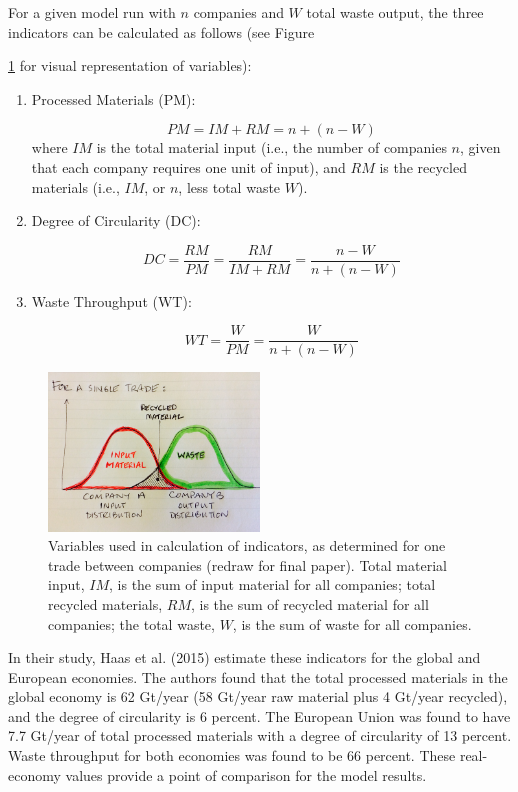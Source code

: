 \documentclass{article}
\begin{document}
For a given model run with $n$ companies and $W$ total waste output, the three indicators can be calculated as follows (see Figure {\ref{fig:Variables} for visual representation of variables):

\begin{enumerate}
\item Processed Materials (PM): 

\[PM = IM+RM = n+(n-W)\]
where $IM$ is the total material input (i.e., the number of companies $n$, given that each company requires one unit of input), and $RM$ is the recycled materials (i.e., $IM$, or $n$, less total waste $W$).

\item Degree of Circularity (DC):

\[DC = \frac{RM}{PM}=\frac{RM}{IM+RM}=\frac{n-W}{n+(n-W)}\]

\item Waste Throughput (WT):

\[WT = \frac{W}{PM}=\frac{W}{n+(n-W)}\]
\end{enumerate}

\begin{figure}
\centering
\includegraphics[width=0.5\textwidth]{figures/Variables.png}
\caption{\label{fig:Variables}Variables used in calculation of indicators, as determined for one trade between companies (redraw for final paper). Total material input, $IM$, is the sum of input material for all companies; total recycled materials, $RM$, is the sum of recycled material for all companies; the total waste, $W$, is the sum of waste for all companies.}
\end{figure}


In their study, Haas et al. (2015) estimate these indicators for the global and European economies. The authors found that the total processed materials in the global economy is 62 Gt/year (58 Gt/year raw material plus 4 Gt/year recycled), and the degree of circularity is 6 percent. The European Union was found to have 7.7 Gt/year of total processed materials with a degree of circularity of 13 percent. Waste throughput for both economies was found to be 66 percent. These real-economy values provide a point of comparison for the model results.

}
\end{document}
